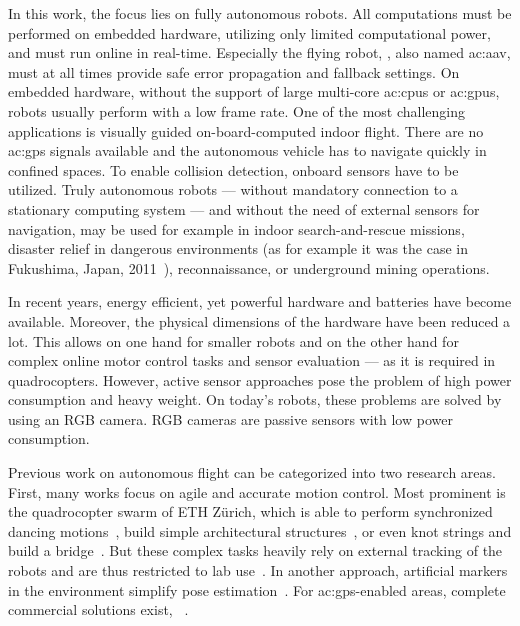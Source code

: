 In this work, the focus lies on fully autonomous robots.
All computations must be performed on embedded hardware, \ie utilizing only limited computational power, and must run online in real-time.
Especially the flying robot, , also named \gls{ac:aav}, must at all times provide safe error propagation and fallback settings.
On embedded hardware, without the support of large multi-core \glspl{ac:cpu} or \glspl{ac:gpu}, robots usually perform with a low frame rate.
One of the most challenging applications is visually guided on-board-com\-pu\-ted indoor flight.
There are no \gls{ac:gps} signals available and the autonomous vehicle has to navigate quickly in confined spaces.
To enable collision detection, onboard sensors have to be utilized.
Truly autonomous robots --- without mandatory connection to a stationary computing system --- and without the need of external sensors for navigation, may be used for example in indoor search-and-rescue missions, disaster relief in dangerous environments (as for example it was the case in Fukushima, Japan, 2011~\cite{chino2011preliminary}), reconnaissance, or underground mining operations.

In recent years, energy efficient, yet powerful hardware and batteries have become available.
Moreover, the physical dimensions of the hardware have been reduced a lot.
This allows on one hand for smaller robots and on the other hand for complex online motor control tasks and sensor evaluation --- as it is required in quadrocopters.
However, active sensor approaches pose the problem of high power consumption and heavy weight.
On today's robots, these problems are solved by using an RGB camera.
RGB cameras are passive sensors with low power consumption.

Previous work on autonomous flight can be categorized into two research areas.
First, many works focus on agile and accurate motion control. Most prominent is the quadrocopter swarm of ETH Zürich, which is able to perform synchronized dancing motions~\cite{schSPRI14}, build simple architectural structures~\cite{augugliaro2014flight}, or even knot strings and build a bridge~\cite{augugliaro2015knot}. 
But these complex tasks heavily rely on external tracking of the robots and are thus restricted to lab use~\cite{brescianini2018trajectory}. 
In another approach, artificial markers in the environment simplify pose estimation~\cite{eberli2011vision}. 
For \gls{ac:gps}-enabled areas, complete commercial solutions exist, \eg~\cite{vasarhelyi2014outdoor,radiansyah2017quadcopter}.

